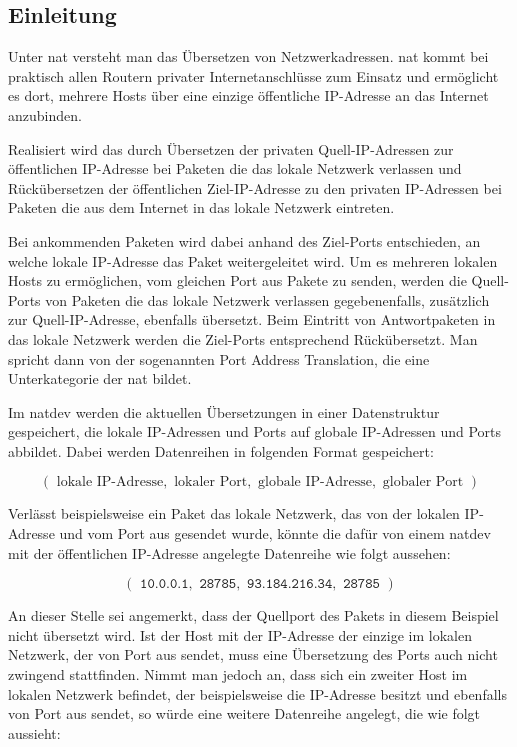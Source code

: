 
\label{dcl-natt}

\subsection{Einleitung}
Unter \gls{nat} versteht man das Übersetzen von Netzwerkadressen.
\Gls{nat} kommt bei praktisch allen Routern privater Internetanschlüsse zum
Einsatz und ermöglicht es dort, mehrere Hosts über eine einzige öffentliche
IP-Adresse an das Internet anzubinden.

Realisiert wird das durch Übersetzen der privaten Quell-IP-Adressen zur
öffentlichen IP-Adresse bei Paketen die das lokale Netzwerk verlassen und
Rückübersetzen der öffentlichen Ziel-IP-Adresse zu den privaten IP-Adressen
bei Paketen die aus dem Internet in das lokale Netzwerk eintreten.

Bei ankommenden Paketen wird dabei anhand des Ziel-Ports entschieden, an welche
lokale IP-Adresse das Paket weitergeleitet wird.
Um es mehreren lokalen Hosts zu ermöglichen, vom gleichen Port aus Pakete zu
senden, werden die Quell-Ports von Paketen die das lokale Netzwerk verlassen
gegebenenfalls, zusätzlich zur Quell-IP-Adresse, ebenfalls übersetzt.
Beim Eintritt von Antwortpaketen in das lokale Netzwerk werden die Ziel-Ports
entsprechend Rückübersetzt. Man spricht dann von der sogenannten Port Address
Translation, die eine Unterkategorie der \acrlong{nat} bildet.

Im \gls{natdev} werden die aktuellen Übersetzungen in einer Datenstruktur
gespeichert, die lokale IP-Adressen und Ports auf globale IP-Adressen und Ports
abbildet.
Dabei werden Datenreihen in folgenden Format gespeichert:

\begin{equation*}
    (\text{ lokale IP-Adresse}, \text{ lokaler Port}, \text{ globale IP-Adresse}, \text{ globaler Port })
\end{equation*}

Verlässt beispielsweise ein Paket das lokale Netzwerk, das von der lokalen
IP-Adresse  und vom Port  aus gesendet wurde,
könnte die dafür von einem \gls{natdev} mit der öffentlichen IP-Adresse
 angelegte Datenreihe wie folgt aussehen:

\begin{equation*}
    (\texttt{ 10.0.0.1}, \texttt{ 28785}, \texttt{ 93.184.216.34}, \texttt{ 28785 })
\end{equation*}

An dieser Stelle sei angemerkt, dass der Quellport des Pakets in diesem Beispiel
nicht übersetzt wird.
Ist der Host mit der IP-Adresse  der einzige im lokalen Netzwerk,
der von Port  aus sendet, muss eine Übersetzung des Ports auch nicht
zwingend stattfinden.
Nimmt man jedoch an, dass sich ein zweiter Host im lokalen Netzwerk befindet,
der beispielsweise die IP-Adresse  besitzt und ebenfalls von Port
 aus sendet, so würde eine weitere Datenreihe angelegt, die wie
folgt aussieht:

